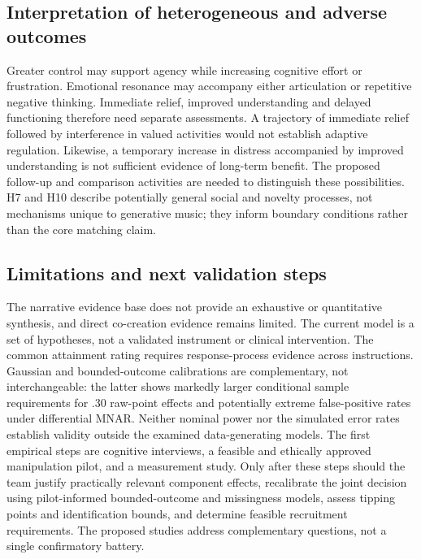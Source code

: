 \documentclass[11pt,a4paper]{article}
\begin{document}
\subsection{Interpretation of heterogeneous and adverse outcomes}
Greater control may support agency while increasing cognitive effort or frustration. Emotional resonance may accompany either articulation or repetitive negative thinking. Immediate relief, improved understanding and delayed functioning therefore need separate assessments. A trajectory of immediate relief followed by interference in valued activities would not establish adaptive regulation. Likewise, a temporary increase in distress accompanied by improved understanding is not sufficient evidence of long-term benefit. The proposed follow-up and comparison activities are needed to distinguish these possibilities. H7 and H10 describe potentially general social and novelty processes, not mechanisms unique to generative music; they inform boundary conditions rather than the core matching claim.

\subsection{Limitations and next validation steps}
The narrative evidence base does not provide an exhaustive or quantitative synthesis, and direct co-creation evidence remains limited. The current model is a set of hypotheses, not a validated instrument or clinical intervention. The common attainment rating requires response-process evidence across instructions. Gaussian and bounded-outcome calibrations are complementary, not interchangeable: the latter shows markedly larger conditional sample requirements for .30 raw-point effects and potentially extreme false-positive rates under differential MNAR. Neither nominal power nor the simulated error rates establish validity outside the examined data-generating models. The first empirical steps are cognitive interviews, a feasible and ethically approved manipulation pilot, and a measurement study. Only after these steps should the team justify practically relevant component effects, recalibrate the joint decision using pilot-informed bounded-outcome and missingness models, assess tipping points and identification bounds, and determine feasible recruitment requirements. The proposed studies address complementary questions, not a single confirmatory battery.
\end{document}
